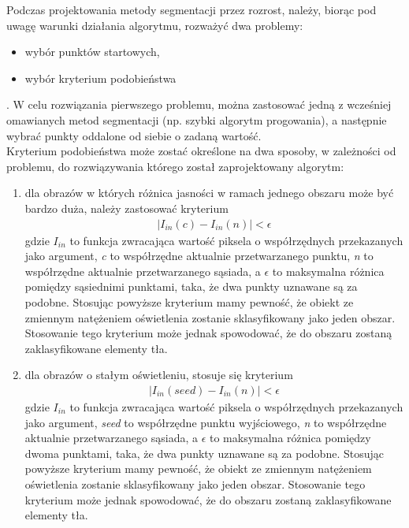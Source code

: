 Podczas projektowania metody segmentacji przez rozrost, należy, biorąc pod uwagę warunki działania algorytmu, rozważyć dwa problemy:
\begin{itemize}
  \item wybór punktów startowych,
  \item wybór kryterium podobieństwa
\end{itemize}.
W celu rozwiązania pierwszego problemu, można zastosować jedną z wcześniej omawianych metod segmentacji (np. szybki algorytm progowania), a następnie wybrać punkty oddalone od siebie o zadaną wartość. \\
Kryterium podobieństwa może zostać określone na dwa sposoby, w zależności od problemu, do rozwiązywania którego został zaprojektowany algorytm:
\begin{enumerate}
  \item dla obrazów w których różnica jasności w ramach jednego obszaru może być bardzo duża, należy zastosować kryterium 
    \begin{gather*}
      |I_{in}(c) - I_{in}(n)| < \epsilon
    \end{gather*}
    gdzie $I_{in}$ to funkcja zwracająca wartość piksela o współrzędnych przekazanych jako argument, \textit{c} to współrzędne aktualnie przetwarzanego punktu, \textit{n} to współrzędne aktualnie przetwarzanego sąsiada, a $\epsilon$ to maksymalna różnica pomiędzy sąsiednimi punktami, taka, że dwa punkty uznawane są za podobne. Stosując powyższe kryterium mamy pewność, że obiekt ze zmiennym natężeniem oświetlenia zostanie sklasyfikowany jako jeden obszar. Stosowanie tego kryterium może jednak spowodować, że do obszaru zostaną zaklasyfikowane elementy tła.
    \item dla obrazów o stałym oświetleniu, stosuje się kryterium
      \begin{gather*}
        |I_{in}(seed) - I_{in}(n)| < \epsilon
      \end{gather*}
      gdzie $I_{in}$ to funkcja zwracająca wartość piksela o współrzędnych przekazanych jako argument, \textit{seed} to współrzędne punktu wyjściowego, \textit{n} to współrzędne aktualnie przetwarzanego sąsiada, a $\epsilon$ to maksymalna różnica pomiędzy dwoma punktami, taka, że dwa punkty uznawane są za podobne. Stosując powyższe kryterium mamy pewność, że obiekt ze zmiennym natężeniem oświetlenia zostanie sklasyfikowany jako jeden obszar. Stosowanie tego kryterium może jednak spowodować, że do obszaru zostaną zaklasyfikowane elementy tła.
\end{enumerate}
